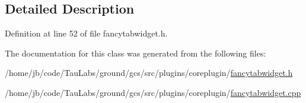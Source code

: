 \subsection{\-Detailed \-Description}


\-Definition at line 52 of file fancytabwidget.\-h.



\-The documentation for this class was generated from the following files\-:\begin{DoxyCompactItemize}
\item 
/home/jb/code/\-Tau\-Labs/ground/gcs/src/plugins/coreplugin/\hyperlink{coreplugin_2fancytabwidget_8h}{fancytabwidget.\-h}\item 
/home/jb/code/\-Tau\-Labs/ground/gcs/src/plugins/coreplugin/\hyperlink{coreplugin_2fancytabwidget_8cpp}{fancytabwidget.\-cpp}\end{DoxyCompactItemize}
